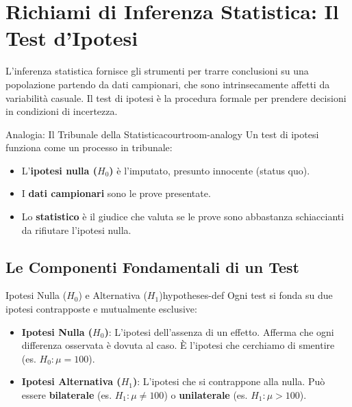 \section{Richiami di Inferenza Statistica: Il Test d'Ipotesi}

L'inferenza statistica fornisce gli strumenti per trarre conclusioni su una popolazione partendo da dati campionari, che sono intrinsecamente affetti da variabilità casuale. Il test di ipotesi è la procedura formale per prendere decisioni in condizioni di incertezza.

\begin{nota}{Analogia: Il Tribunale della Statistica}{courtroom-analogy}
Un test di ipotesi funziona come un processo in tribunale:
\begin{itemize}
    \item L'\textbf{ipotesi nulla ($H_0$)} è l'imputato, presunto innocente (status quo).
    \item I \textbf{dati campionari} sono le prove presentate.
    \item Lo \textbf{statistico} è il giudice che valuta se le prove sono abbastanza schiaccianti da rifiutare l'ipotesi nulla.
\end{itemize}
\end{nota}

\subsection{Le Componenti Fondamentali di un Test}

\begin{definizione}{Ipotesi Nulla ($H_0$) e Alternativa ($H_1$)}{hypotheses-def}
Ogni test si fonda su due ipotesi contrapposte e mutualmente esclusive:
\begin{itemize}
    \item \textbf{Ipotesi Nulla ($H_0$)}: L'ipotesi dell'assenza di un effetto. Afferma che ogni differenza osservata è dovuta al caso. È l'ipotesi che cerchiamo di smentire (es. $H_0: \mu = 100$).
    \item \textbf{Ipotesi Alternativa ($H_1$)}: L'ipotesi che si contrappone alla nulla. Può essere \textbf{bilaterale} (es. $H_1: \mu \neq 100$) o \textbf{unilaterale} (es. $H_1: \mu > 100$).
\end{itemize}
\end{definizione}

